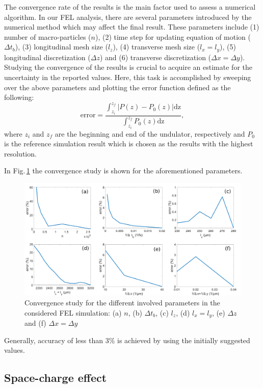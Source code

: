 The convergence rate of the results is the main factor used to assess a numerical algorithm. %
In our FEL analysis, there are several parameters introduced by the numerical method which may affect the final result. %
These parameters include (1) number of macro-particles ($n$), (2) time step for updating equation of motion ($\Delta t_b$), (3) longitudinal mesh size ($l_z$), (4) transverse mesh size ($l_x=l_y$), (5) longitudinal discretization ($\Delta z$) and (6) transverse discretization ($\Delta x = \Delta y$). %
Studying the convergence of the results is crucial to acquire an estimate for the uncertainty in the reported values. %
Here, this task is accomplished by sweeping over the above parameters and plotting the error function defined as the following:
\begin{equation}
\label{errorDefinition}
\mathrm{error} = \frac{\int_{z_i}^{z_f} | P(z)-P_0(z) | \mathrm{dz}}{\int_{z_i}^{z_f} P_0(z) \mathrm{dz}},
\end{equation}
where $z_i$ and $z_f$ are the beginning and end of the undulator, respectively and $P_0$ is the reference simulation result which is chosen as the results with the highest resolution. %

In Fig.\,\ref{convergenceStudy} the convergence study is shown for the aforementioned parameters. %
\begin{figure}
\centering
\includegraphics[width=7.0in]{./MITHRA_EXAMPLES/Fig3/Fig3.pdf}
\caption{Convergence study for the different involved parameters in the considered FEL simulation: (a) $n$, (b) $\Delta t_b$, (c) $l_z$, (d) $l_x=l_y$, (e) $\Delta z$ and (f) $\Delta x = \Delta y$}
\label{convergenceStudy}
\end{figure}
%
Generally, accuracy of less than 3\% is achieved by using the initially suggested values.

\subsection{Space-charge effect}

